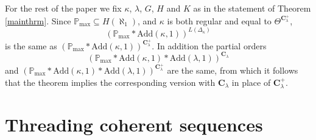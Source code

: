 \documentclass[12pt]{article}
\newtheorem{theorem}{Theorem}[section]
\def\c{{\mathbf{C}}}
\def\bbC{{\mathbf{C}}}
\renewcommand{\models}{\vDash}
\def\k{\kappa}
\def\l{\lambda}
\newcommand{\ADR}{\mathsf{AD}_{\mathbb{R}}}
\newcommand{\Add}{\mathrm{Add}}
\newcommand{\pmax}{\mathbb{P}_{\mathrm{max}}}
\begin{document}
For the rest of the paper we fix $\kappa$, $\lambda$, $G$, $H$ and $K$ as in the statement of Theorem \ref{mainthrm}.
Since $\pmax \subseteq H(\aleph_{1})$, and $\kappa$ is both regular and equal to $\Theta^{\c^{+}_{\lambda}}$, \[(\pmax * \Add(\kappa, 1))^{L(\Delta_{\k})}\] is the same as
$(\pmax * \Add(\kappa, 1))^{\c^{+}_{\lambda}}$.
In addition the partial orders \[(\pmax*\Add(\k, 1)*\Add(\l, 1))^{\c_{\l}}\] and $(\pmax*\Add(\k, 1)*\Add(\l, 1))^{\c^{+}_{\l}}$ are the same, from which it follows that the theorem implies the corresponding version with $\bbC_{\lambda}$ in place of $\bbC^{+}_{\lambda}$.







\section{Threading coherent sequences}\label{threadsec}
\end{document}
